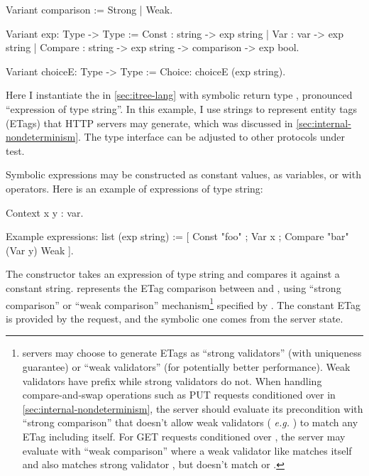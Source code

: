 \begin{coq}
  Variant comparison := Strong | Weak.

  Variant exp: Type -> Type :=
    Const    : string -> exp string
  | Var      : var    -> exp string
  | Compare  : string -> exp string -> comparison -> exp bool.

  Variant choiceE: Type -> Type :=
    Choice: choiceE (exp string).
\end{coq}

Here I instantiate the  in \autoref{sec:itree-lang} with symbolic
return type , pronounced ``expression of type string''.  In
this example, I use strings to represent entity tags (ETags) that HTTP servers
may generate, which was discussed in \autoref{sec:internal-nondeterminism}.  The
type interface can be adjusted to other protocols under test.

Symbolic expressions may be constructed as constant values, as variables, or
with operators.  Here is an example of expressions of type string:
\begin{coq}
  Context x y : var.

  Example expressions: list (exp string) :=
    [ Const   "foo"
    ; Var      x
    ; Compare "bar" (Var y) Weak
    ].
\end{coq}

The  constructor takes an expression of type string and compares it
against a constant string.   represents the ETag
comparison between  and , using ``strong comparison'' or ``weak
comparison'' mechanism\footnote{\http servers may choose to generate ETags as
``strong validators'' (with uniqueness guarantee) or ``weak validators'' (for
potentially better performance).  Weak validators have prefix  while
strong validators do not.  When handling compare-and-swap operations such as PUT
requests conditioned over  in
\autoref{sec:internal-nondeterminism}, the server should evaluate its
precondition with ``strong comparison'' that doesn't allow weak validators ({\it
e.g.} ) to match any ETag including itself.  For GET requests
conditioned over , the server may evaluate with ``weak
comparison'' where a weak validator like  matches itself and
also matches strong validator , but doesn't match 
or .} specified by .  The constant ETag is provided by
the request, and the symbolic one comes from the server state.

